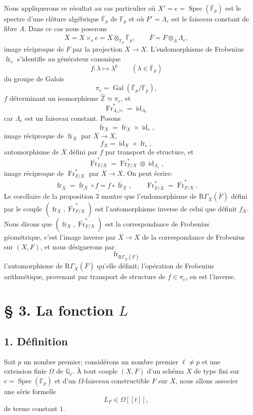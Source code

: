 \documentclass[11pt]{article}
\DeclareMathOperator{\Spec}{Spec}
\providecommand{\Gal}{\operatorname{Gal}}
\providecommand{\RGamma}{\mathrm R\Gamma}
\providecommand{\id}{\operatorname{id}}
\providecommand{\id}{\operatorname{id}}
\providecommand{\id}{\operatorname{id}}
\providecommand{\RGamma}{\mathrm R\Gamma}
\providecommand{\id}{\operatorname{id}}
\providecommand{\Spec}{\operatorname{Spec}}
\providecommand{\Spec}{\operatorname{Spec}}
\providecommand{\id}{\operatorname{id}}
\providecommand{\Spec}{\operatorname{Spec}}
\providecommand{\fr}{\operatorname{fr}}
\providecommand{\Fr}{\operatorname{Fr}}
\providecommand{\Fr}{\operatorname{Fr}}
\providecommand{\fr}{\operatorname{fr}}
\providecommand{\Spec}{\operatorname{Spec}}
\providecommand{\id}{\operatorname{id}}
\providecommand{\RGamma}{\mathrm R\Gamma}
\providecommand{\Gal}{\operatorname{Gal}}
\begin{document}
Nous appliquerons ce résultat au cas particulier où $X'=e=\Spec(\overline{\mathbb F}_p)$ est le spectre d'une clôture algébrique $\overline{\mathbb F}_p$ de $\mathbb F_p$ et où $F'=\Lambda_e$ est le faisceau constant de fibre $\Lambda$. Dans ce cas nous poserons
\[
\overline X=X\times_e e=X\otimes_{\mathbb F_p}\overline{\mathbb F}_p,
\qquad
\overline F=F\otimes_\Lambda\Lambda_e,
\]
image réciproque de $F$ par la projection $\overline X\to X$. L'endomorphisme de Frobenius $\fr_e$ s'identifie au générateur canonique
\[
f:\lambda\longmapsto\lambda^p\qquad(\lambda\in\overline{\mathbb F}_p)
\]
du groupe de Galois
\[
\pi_e=\Gal(\overline{\mathbb F}_p/\mathbb F_p),
\]
$f$ déterminant un isomorphisme $\widehat{\mathbb Z}\simeq\pi_e$, et
\[
\Fr^*_{\Lambda_e/e}=\id_{\Lambda_e}
\]
car $\Lambda_e$ est un faisceau constant. Posons
\[
\overline{\fr}_X=\fr_X\times\id_e,
\]
image réciproque de $\fr_X$ par $\overline X\to X$,
\[
f_X=\id_X\times\fr_e,
\]
automorphisme de $\overline X$ défini par $f$ par transport de structure, et
\[
\overline{\Fr}^*_{F/X}=\Fr^*_{F/X}\otimes\id_{\Lambda_e},
\]
image réciproque de $\Fr^*_{F/X}$ par $\overline X\to X$. On peut écrire:
\[
\fr_{\overline X}=\overline{\fr}_X\circ f=f\circ\overline{\fr}_X,
\qquad
\Fr^*_{\overline F/\overline X}=\overline{\Fr}^*_{F/X}.
\]
Le corollaire de la proposition 3 montre que l'endomorphisme de $\RGamma_{\overline X}(\overline F)$ défini par le couple $(\fr_X,\overline{\Fr}^*_{F/X})$ est l'automorphisme inverse de celui que définit $f_X$. Nous dirons que $(\fr_X,\overline{\Fr}^*_{F/X})$ est la correspondance de Frobenius géométrique, c'est l'image inverse par $\overline X\to X$ de la correspondance de Frobenius sur $(X,F)$, et nous désignerons par
\[
\fr_{\RGamma_{\overline X}(\overline F)}
\]
l'automorphisme de $\RGamma_{\overline X}(\overline F)$ qu'elle définit; l'opération de Frobenius arithmétique, provenant par transport de structure de $f\in\pi_e$, en est l'inverse.

\section*{§ 3. La fonction $L$}

\subsection*{1. Définition}

Soit $p$ un nombre premier; considérons un nombre premier $\ell\ne p$ et une extension finie $\Omega$ de $\mathbb Q_\ell$. À tout couple $(X,F)$ d'un schéma $X$ de type fini sur $e=\Spec(\mathbb F_p)$ et d'un $\Omega$-faisceau constructible $F$ sur $X$, nous allons associer une série formelle
\[
L_F\in\Omega[[t]],
\]
de terme constant $1$.
\end{document}
